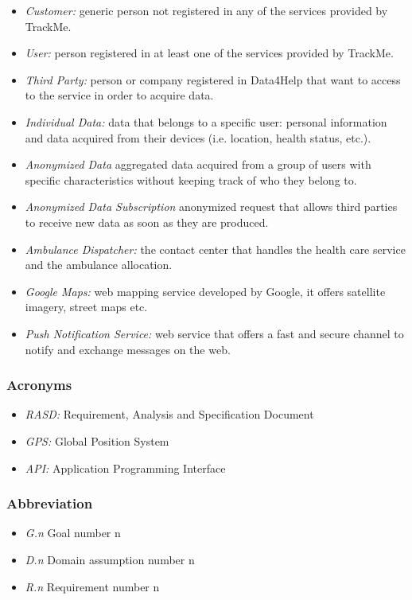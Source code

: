 \documentclass[a4paper]{article}
\begin{document}
    \begin{itemize}
        \item \textit{Customer:} generic person not registered in any of the services provided by TrackMe. 
        \item \textit{User:} person registered in at least one of the services provided by TrackMe.
        \item \textit{Third Party:} person or company registered in Data4Help that want to access to the service in order to acquire data.
        \item \textit{Individual Data:} data that belongs to a specific user: personal information and data acquired from their devices (i.e. location, health status, etc.).
        \item \textit{Anonymized Data} aggregated data acquired from a group of users with specific characteristics without keeping track of who they belong to.
        \item \textit{Anonymized Data Subscription} anonymized request that allows third parties to receive new data as soon as they are produced.
        \item \textit{Ambulance Dispatcher:} the contact center that handles the health care service and the ambulance allocation.
        \item \textit{Google Maps:} web mapping service developed by Google, it offers satellite imagery, street maps etc.
        \item \textit{Push Notification Service:} web service that offers a fast and secure channel to notify and exchange messages on the web.
    \end{itemize}
    
    \subsubsection{Acronyms}
    
    \begin{itemize}
        \item \textit{RASD:} Requirement, Analysis and Specification Document
        \item \textit{GPS:} Global Position System
        \item \textit{API:} Application Programming Interface
    \end{itemize}
    
    \subsubsection{Abbreviation}
        \begin{itemize}
        \item \textit{G.n} Goal number n
        \item \textit{D.n} Domain assumption number n
        \item \textit{R.n} Requirement number n
    \end{itemize}
\end{document}
